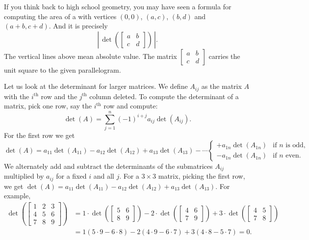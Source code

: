 If you think back to high school geometry, you may have seen a formula for
computing the area of a 
with vertices $(0,0)$, $(a,c)$, $(b,d)$
and $(a+b,c+d)$.  And it is precisely
\begin{equation*}
\left\lvert \, \det \left(
\begin{bmatrix} a & b \\ c & d \end{bmatrix}
\right) \, \right\lvert.
\end{equation*}
The vertical lines above mean absolute value.
The matrix $\left[ \begin{smallmatrix} a & b \\ c & d \end{smallmatrix}
\right]$
carries the unit square to the given parallelogram.

\medskip

Let us look at the determinant for larger matrices.  We define $A_{ij}$ as
the matrix $A$ with the $i^{\text{th}}$ row and the $j^{\text{th}}$ column
deleted.  To compute the determinant of a matrix, pick one row, say the
$i^{\text{th}}$ row and compute:
\begin{equation*}
\boxed{~~
\det (A) =
\sum_{j=1}^n
{(-1)}^{i+j}
a_{ij} \det (A_{ij}) .
~~}
\end{equation*}
For the first row we get
\begin{equation*}
\det (A) =
a_{11} \det (A_{11}) - 
a_{12} \det (A_{12}) + 
a_{13} \det (A_{13}) - 
\cdots
\begin{cases}
+ a_{1n} \det (A_{1n}) & \text{if } n \text{ is odd,} \\
- a_{1n} \det (A_{1n}) & \text{if } n \text{ even.}
\end{cases}
\end{equation*}
We alternately add and subtract the determinants of the submatrices
$A_{ij}$ multiplied by $a_{ij}$ for a fixed $i$ and all $j$.
For a $3 \times 3$ matrix,
picking the first row, we get $\det (A) = a_{11} \det (A_{11}) -
a_{12} \det (A_{12}) + a_{13} \det (A_{13})$.  For example,
\begin{equation*}
\begin{split}
\det \left(
\begin{bmatrix}
1 & 2 & 3 \\
4 & 5 & 6 \\
7 & 8 & 9
\end{bmatrix}
\right)
& =
1 \cdot
\det \left(
\begin{bmatrix}
5 & 6 \\
8 & 9
\end{bmatrix}
\right)
-
2 \cdot
\det \left(
\begin{bmatrix}
4 & 6 \\
7 & 9
\end{bmatrix}
\right)
+
3 \cdot
\det \left(
\begin{bmatrix}
4 & 5 \\
7 & 8
\end{bmatrix}
\right) \\
& =
1 (5 \cdot 9 - 6 \cdot 8)
-
2 (4 \cdot 9 - 6 \cdot 7)
+
3 (4 \cdot 8 - 5 \cdot 7)
= 0 .
\end{split}
\end{equation*}

